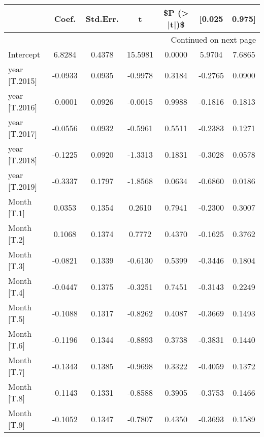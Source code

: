 \begin{longtable}{p{4cm}cccccc}
\toprule
{} &   Coef. &  Std.Err. &       t &  \$P (> |t|)\$ &  [0.025 &  0.975] \\
\midrule
\endhead
\midrule
\multicolumn{7}{r}{{Continued on next page}} \\
\midrule
\endfoot

\bottomrule
\endlastfoot
Intercept                                     &  6.8284 &    0.4378 & 15.5981 &       0.0000 &  5.9704 &  7.6865 \\
year [T.2015]                                 & -0.0933 &    0.0935 & -0.9978 &       0.3184 & -0.2765 &  0.0900 \\
year [T.2016]                                 & -0.0001 &    0.0926 & -0.0015 &       0.9988 & -0.1816 &  0.1813 \\
year [T.2017]                                 & -0.0556 &    0.0932 & -0.5961 &       0.5511 & -0.2383 &  0.1271 \\
year [T.2018]                                 & -0.1225 &    0.0920 & -1.3313 &       0.1831 & -0.3028 &  0.0578 \\
year [T.2019]                                 & -0.3337 &    0.1797 & -1.8568 &       0.0634 & -0.6860 &  0.0186 \\
Month [T.1]                                   &  0.0353 &    0.1354 &  0.2610 &       0.7941 & -0.2300 &  0.3007 \\
Month [T.2]                                   &  0.1068 &    0.1374 &  0.7772 &       0.4370 & -0.1625 &  0.3762 \\
Month [T.3]                                   & -0.0821 &    0.1339 & -0.6130 &       0.5399 & -0.3446 &  0.1804 \\
Month [T.4]                                   & -0.0447 &    0.1375 & -0.3251 &       0.7451 & -0.3143 &  0.2249 \\
Month [T.5]                                   & -0.1088 &    0.1317 & -0.8262 &       0.4087 & -0.3669 &  0.1493 \\
Month [T.6]                                   & -0.1196 &    0.1344 & -0.8893 &       0.3738 & -0.3831 &  0.1440 \\
Month [T.7]                                   & -0.1343 &    0.1385 & -0.9698 &       0.3322 & -0.4059 &  0.1372 \\
Month [T.8]                                   & -0.1143 &    0.1331 & -0.8588 &       0.3905 & -0.3753 &  0.1466 \\
Month [T.9]                                   & -0.1052 &    0.1347 & -0.7807 &       0.4350 & -0.3693 &  0.1589 \\

\end{longtable}
